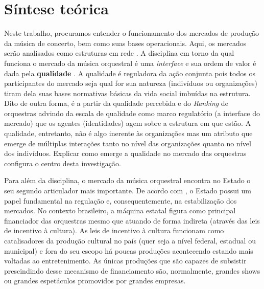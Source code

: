 \documentclass[a4paper, 12pt, openright, oneside, german, french, english, brazil]{abntex2}
\begin{document}
	
	
	



	\section{Síntese teórica}

	Neste trabalho, procuramos entender o funcionamento dos mercados de produção da música de concerto, bem como suas bases operacionais. Aqui, os mercados serão analisados como estruturas em rede \cite{white2002markets}. A disciplina em torno da qual funciona o mercado da música orquestral é uma \textit{interface} e sua ordem de valor é dada pela \textbf{qualidade} \cite{white2002markets}. A qualidade é reguladora da ação conjunta pois todos os participantes do mercado seja qual for sua natureza (indivíduos ou organizações) tiram dela suas bases normativas básicas da vida social imbuídas na estrutura. Dito de outra forma, é a partir da qualidade percebida e do \textit{Ranking} de orquestras advindo da escala de qualidade como marco regulatório (a interface do mercado) que os agentes (identidades) agem sobre a estrutura em que estão. A qualidade, entretanto, não é algo inerente às organizações mas um atributo que emerge de múltiplas interações tanto no nível das organizações quanto no nível dos indivíduos. Explicar como emerge a qualidade no mercado das orquestras configura o centro desta investigação.

	Para além da disciplina, o mercado da música orquestral encontra no Estado o seu segundo articulador mais importante.	De acordo com , o Estado possui um papel fundamental na regulação e, consequentemente, na estabilização dos mercados. No contexto brasileiro, a máquina estatal figura como principal financiador das orquestras mesmo que atuando de forma indireta (através das leis de incentivo à cultura). As leis de incentivo à cultura funcionam como catalisadores da produção cultural no país (quer seja a nível federal, estadual ou municipal) e fora do seu escopo há poucas produções acontecendo estando mais voltadas ao entretenimento. As únicas produções que são capazes de subsistir prescindindo desse mecanismo de financiamento são, normalmente, grandes shows ou grandes espetáculos promovidos por grandes empresas.
\end{document}
